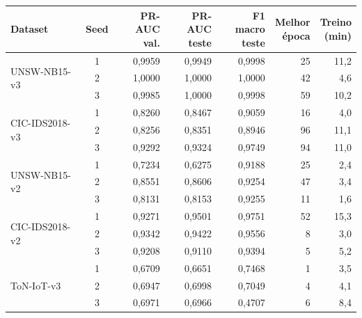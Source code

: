 \begin{tabular}{lcrrrrr}
\toprule
Dataset & Seed & \makecell{PR-AUC\\val.} & \makecell{PR-AUC\\teste} & \makecell{F1 macro\\teste} & \makecell{Melhor\\época} & \makecell{Treino\\(min)} \\
\midrule
\multirow{3}{*}{UNSW-NB15-v3} & 1 & 0,9959 & 0,9949 & 0,9998 & 25 & 11,2 \\
 & 2 & 1,0000 & 1,0000 & 1,0000 & 42 & 4,6 \\
 & 3 & 0,9985 & 1,0000 & 0,9998 & 59 & 10,2 \\
\midrule
\multirow{3}{*}{CIC-IDS2018-v3} & 1 & 0,8260 & 0,8467 & 0,9059 & 16 & 4,0 \\
 & 2 & 0,8256 & 0,8351 & 0,8946 & 96 & 11,1 \\
 & 3 & 0,9292 & 0,9324 & 0,9749 & 94 & 11,0 \\
\midrule
\multirow{3}{*}{UNSW-NB15-v2} & 1 & 0,7234 & 0,6275 & 0,9188 & 25 & 2,4 \\
 & 2 & 0,8551 & 0,8606 & 0,9254 & 47 & 3,4 \\
 & 3 & 0,8131 & 0,8153 & 0,9255 & 11 & 1,6 \\
\midrule
\multirow{3}{*}{CIC-IDS2018-v2} & 1 & 0,9271 & 0,9501 & 0,9751 & 52 & 15,3 \\
 & 2 & 0,9342 & 0,9422 & 0,9556 & 8 & 3,0 \\
 & 3 & 0,9208 & 0,9110 & 0,9394 & 5 & 5,2 \\
\midrule
\multirow{3}{*}{ToN-IoT-v3} & 1 & 0,6709 & 0,6651 & 0,7468 & 1 & 3,5 \\
 & 2 & 0,6947 & 0,6998 & 0,7049 & 4 & 4,1 \\
 & 3 & 0,6971 & 0,6966 & 0,4707 & 6 & 8,4 \\
\bottomrule
\end{tabular}

